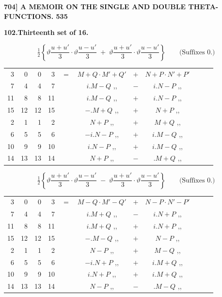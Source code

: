 \documentclass[11pt]{article}
\newcommand{\half}{\tfrac{1}{2}}
\begin{document}
\newpage
\noindent\textbf{704] \quad A MEMOIR ON THE SINGLE AND DOUBLE THETA-FUNCTIONS. \hfill 535}

\medskip
\begin{center}\textbf{102.\quad Thirteenth set of 16.}\end{center}

\[
\half\!\left\{\vartheta\frac{u+u'}{3}\cdot\vartheta\frac{u-u'}{3}\;+\;\vartheta\frac{u+u'}{3}\cdot\vartheta\frac{u-u'}{3}\right\}\qquad\text{(Suffixes 0.)}
\]
{\small
\begin{center}
\begin{tabular}{rrrrr@{\ }c@{\ }lcr@{\ }c@{\ }l}
3  & 0  & 0  & 3  & $=$ & $M+Q\cdot M'+Q'$ & $+$ & $N+P\cdot N'+P'$ \\
7  & 4  & 4  & 7  & & $i.M-Q$ \quad ,, & $-$ & $i.N-P$ \quad ,, \\
11 & 8  & 8  & 11 & & $i.M-Q$ \quad ,, & $+$ & $i.N-P$ \quad ,, \\
15 & 12 & 12 & 15 & & $-.M+Q$ \quad ,, & $+$ & $N+P$ \quad ,, \\
2  & 1  & 1  & 2  & & $N+P$ \quad ,, & $+$ & $M+Q$ \quad ,, \\
6  & 5  & 5  & 6  & & $-i.N-P$ \quad ,, & $+$ & $i.M-Q$ \quad ,, \\
10 & 9  & 9  & 10 & & $i.N-P$ \quad ,, & $+$ & $i.M-Q$ \quad ,, \\
14 & 13 & 13 & 14 & & $N+P$ \quad ,, & $-$ & $.M+Q$ \quad ,, \\
\end{tabular}
\end{center}
}

\[
\half\!\left\{\vartheta\frac{u+u'}{3}\cdot\vartheta\frac{u-u'}{3}\;-\;\vartheta\frac{u+u'}{3}\cdot\vartheta\frac{u-u'}{3}\right\}\qquad\text{(Suffixes 0.)}
\]
{\small
\begin{center}
\begin{tabular}{rrrrr@{\ }c@{\ }lcr@{\ }c@{\ }l}
3  & 0  & 0  & 3  & $=$ & $M-Q\cdot M'-Q'$ & $+$ & $N-P\cdot N'-P'$ \\
7  & 4  & 4  & 7  & & $i.M+Q$ \quad ,, & $-$ & $i.N+P$ \quad ,, \\
11 & 8  & 8  & 11 & & $i.M+Q$ \quad ,, & $+$ & $i.N+P$ \quad ,, \\
15 & 12 & 12 & 15 & & $-.M-Q$ \quad ,, & $+$ & $N-P$ \quad ,, \\
2  & 1  & 1  & 2  & & $N-P$ \quad ,, & $+$ & $M-Q$ \quad ,, \\
6  & 5  & 5  & 6  & & $-i.N+P$ \quad ,, & $+$ & $i.M+Q$ \quad ,, \\
10 & 9  & 9  & 10 & & $i.N+P$ \quad ,, & $+$ & $i.M+Q$ \quad ,, \\
14 & 13 & 13 & 14 & & $N-P$ \quad ,, & $-$ & $.M-Q$ \quad ,, \\
\end{tabular}
\end{center}
}
\end{document}
